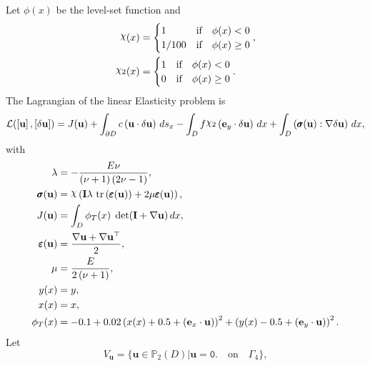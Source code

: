 \documentclass[preview]{standalone}
\let\oldcdot\cdot
\let\cdot\oldcdot
\begin{document}
Let $\phi(x)$ be the level-set function and
 \begin{align*}\raisebox{\depth}{$\chi$}(x) &= \begin{cases} 1 & \mbox{if}\quad \phi(x) < 0 \\ 1/100 & \mbox{if}\quad \phi(x)  \ge 0 \end{cases},\\
\raisebox{\depth}{$\chi_2$}(x) &= \begin{cases} 1 & \mbox{if}\quad \phi(x) < 0 \\ 0 & \mbox{if}\quad \phi(x)  \ge 0 \end{cases}.\end{align*}
The Lagrangian of the linear Elasticity problem is
\begin{dmath*}
\mathcal L(\left[ {\mathbf{ u }}\right],\left[ {\delta\mathbf{  u }}\right]) = J({\mathbf{ u }}) +  \int_{\partial D} c \left( {\mathbf{ u }} \cdot {\delta\mathbf{  u }} \right) \,ds_x -  \int_{D} f \raisebox{\depth}{$\chi_2$} \left( \mathbf e_y \cdot {\delta\mathbf{  u }} \right) \,dx +  \int_{D} \left( \pmb \sigma({\mathbf{ u }}) \mathrel{:}  \nabla {\delta\mathbf{  u }}  \right) \,dx , 
\end{dmath*}
with 
\begin{align*}
\lambda &= - \frac{E \nu}{\left(\nu + 1\right) \left(2 \nu - 1\right)},\\
\pmb \sigma({\mathbf{ u }}) &= \raisebox{\depth}{$\chi$} \left(\mathbf{I} \lambda  \,\operatorname{tr}\left(\pmb \varepsilon({\mathbf{ u }})\right)  + 2 \mu \pmb \varepsilon({\mathbf{ u }})\right),\\
J({\mathbf{ u }}) &=  \int_{D} \phi_{T}(x)  \;\operatorname{det}(\mathbf{I} +  \nabla {\mathbf{ u }} )  \,dx,\\
\pmb \varepsilon({\mathbf{ u }}) &= \frac{ \nabla {\mathbf{ u }}  +   \nabla {\mathbf{ u }} ^\top }{2},\\
\mu &= \frac{E}{2 \left(\nu + 1\right)},\\
y(x) &= y,\\
x(x) &= x,\\
\phi_{T}(x) &= -0.1 + 0.02 \left(x(x) + 0.5 + \left( \mathbf e_x \cdot {\mathbf{ u }} \right)\right)^{2} + \left(y(x) - 0.5 + \left( \mathbf e_y \cdot {\mathbf{ u }} \right)\right)^{2}.
 \end{align*}
Let
\begin{equation*}
V_{{\mathbf{ u }}} = \{ {\mathbf{ u }} \in \mathbb P_{2}(D)| {\mathbf{ u }} = \mathtt{\text{0.}}  \quad \text{{on}} \quad\Gamma_{4} \},\end{equation*}
\end{document}
